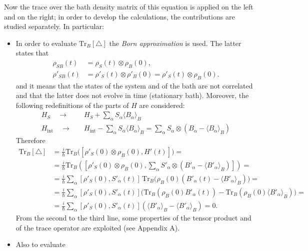 Now the trace over the bath density matrix of this equation is applied on the left and on the right; in order to develop the calculations, the contributions are studied separately. In particular:
\begin{itemize}
    \item In order to evaluate $\text{Tr}_B [ \triangle]$ the \textit{Born approximation} is used. The latter states that 
    \begin{align}
        \rho_{SB}(t) &= \rho_S(t) \otimes \rho_B(0), \\
        \rho'_{SB}(t) &= \rho'_S(t) \otimes \rho'_B(0) = \rho'_S(t) \otimes \rho_B(0).
    \end{align}
    and it means that the states of the system and of the bath are not correlated and that the latter does not evolve in time (stationary bath). Moreover, the following redefinitions of the parts of $H$ are considered: 
    \begin{align*}
        H_S \quad \longrightarrow \quad &H_S + \sum_\alpha S_\alpha \langle B_\alpha \rangle_B \\
        H_\text{int} \quad \longrightarrow \quad & H_\text{int} - \sum_\alpha S_\alpha \langle B_\alpha \rangle_B = \sum_\alpha S_\alpha \otimes \left(B_\alpha - \langle B_\alpha \rangle_B\right)
    \end{align*}
    Therefore
\begin{align*}
    \text{Tr}_B [\triangle] &= \frac{i}{\hbar} \text{Tr}_B \big( [\rho'_S(0) \otimes \rho_B(0),H'(t)]  \big) = \\
    &= \frac{i}{\hbar} \text{Tr}_B \left( \left[ \rho'_S(0) \otimes \rho_B(0),\sum_\alpha S'_\alpha \otimes (B'_\alpha - \langle B'_\alpha \rangle_B) \right] \right) = \\
    &= \frac{i}{\hbar} \sum_\alpha [\rho'_S(0),S'_\alpha(t)] \, \text{Tr}_B \Big( \rho_B(0) \left( B'_\alpha(t) - \langle B'_\alpha \rangle_B \right)\Big) = \\
    &= \frac{i}{\hbar} \sum_\alpha [\rho'_S(0),S'_\alpha(t)] \Big( \text{Tr}_B \left( \rho_B(0) B'_\alpha(t) \right) - \text{Tr}_B \left( \rho_B(0) \langle B'_\alpha \rangle_B \right) \Big) = \\
    &= \frac{i}{\hbar} \sum_\alpha [\rho'_S(0), S'_\alpha(t)] \left(\langle B'_\alpha \rangle_B - \langle B'_\alpha \rangle_B \right) = 0.
\end{align*}
From the second to the third line, some properties of the tensor product and of the trace operator are exploited (see Appendix A).
\item Also to evaluate 

\end{itemize}
